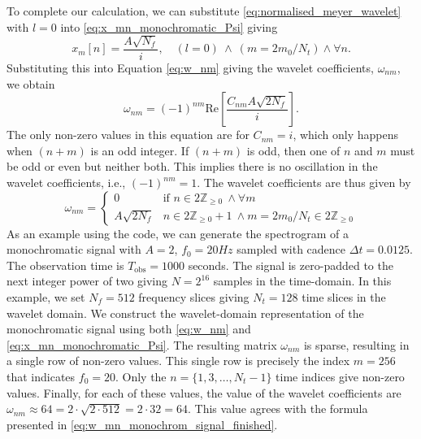 \documentclass{article}
\begin{document}
To complete our calculation, we can substitute \eqref{eq:normalised_meyer_wavelet} with $l = 0$ into \eqref{eq:x_mn_monochromatic_Psi} giving
\begin{equation}
x_{m}[n] = \frac{A\sqrt{N_{f}}}{i}, \quad (l = 0) \ \wedge \ (m = 2m_{0}/N_{t}) \wedge \forall n .
\end{equation}
Substituting this into Equation \eqref{eq:w_nm} giving the wavelet coefficients, $\omega_{nm}$, we obtain
\begin{equation}
\omega_{nm} =(-1)^{nm}\text{Re}\left[\frac{C_{nm}A\sqrt{2N_{f}}}{i}\right].
\end{equation}
The only non-zero values in this equation are for $C_{nm} = i$, which only happens when $(n + m)$ is an odd integer. If $(n+m)$ is odd, then one of $n$ and $m$ must be odd or even but neither both. This implies there is no oscillation in the wavelet coefficients, i.e., $(-1)^{nm} = 1$. The wavelet coefficients are thus given by 
\begin{equation}\label{eq:w_mn_monochrom_signal_finished}
\omega_{nm} = 
\begin{cases}
     0 & \text{if } n \in 2\mathbb{Z}_{\geq 0} \ \wedge \forall m\\
    A\sqrt{2 N_{f}} & n \in 2\mathbb{Z}_{\geq 0} + 1 \ \wedge  m = 2m_{0}/N_{t} \in 2\mathbb{Z}_{\geq 0}
\end{cases}
\end{equation}
As an example using the code, we can generate the spectrogram of a monochromatic signal with $A = 2$, $f_{0} = 20Hz$ sampled with cadence $\Delta t = 0.0125$. The observation time is $T_{\text{obs}} = 1000$ seconds. The signal is zero-padded to the next integer power of two giving $N = 2^{16}$ samples in the time-domain. In this example, we set $N_{f} = 512$ frequency slices giving $N_{t} = 128$ time slices in the wavelet domain. We construct the wavelet-domain representation of the monochromatic signal using both \eqref{eq:w_nm} and \eqref{eq:x_mn_monochromatic_Psi}. The resulting matrix $\omega_{nm}$ is sparse, resulting in a single row of non-zero values. This single row is precisely the index $m = 256$ that indicates $f_{0} = 20$. Only the $n = \{1,3,\ldots, N_{t}-1\}$ time indices give non-zero values. Finally, for each of these values, the value of the wavelet coefficients are $\omega_{nm} \approx 64 = 2\cdot \sqrt{2\cdot 512} = 2\cdot 32 = 64$. This value agrees with the formula presented in \eqref{eq:w_mn_monochrom_signal_finished}. %
\end{document}
